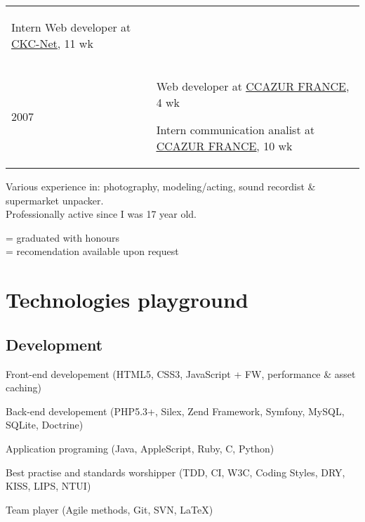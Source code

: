 \documentclass[letterpaper]{article}
\renewenvironment{itemize}{
    \begin{list}{}{
        \setlength{\leftmargin}{1.5em}
    }
}{
    \end{list}
}
\begin{document}
\begin{tabular}{p{1cm}p{\textwidth}}
\begin{itemize}
                \item Intern Web developer at \uline{\href{http://www.ckc-net.com}{CKC-Net}}, 11 wk
            \end{itemize} \\
            \large{2007} & \vspace{-6mm} \begin{itemize}
                \item Web developer at \uline{\href{http://www.ccazur.com}{CCAZUR FRANCE}}, 4 wk
                \item Intern communication analist at \uline{\href{http://www.ccazur.com}{CCAZUR FRANCE}}, 10 wk
            \end{itemize}
        \end{tabular}
        
        \vspace{0.6cm}
        Various experience in: photography, modeling/acting, sound recordist \& supermarket unpacker.\\
        Professionally active since I was 17 year old.

        \vfill
        \begin{flushright}
            \small{ = graduated with honours} \\
            \small{ = recomendation available upon request}
        \end{flushright}

    \section*{Technologies playground}
        
        \subsection*{Development}
            
            \begin{itemize}
                \item Front-end developement (HTML5, CSS3, JavaScript + FW, performance \& asset caching)
                \item Back-end developement (PHP5.3+, Silex, Zend Framework, Symfony, MySQL, SQLite, Doctrine)
                \item Application programing (Java, AppleScript, Ruby, C, Python)
                \item Best practise and standards worshipper (TDD, CI, W3C, Coding Styles, DRY, KISS, LIPS, NTUI)
                \item Team player (Agile methods, Git, SVN, \LaTeX)
            \end{itemize}
            
\end{document}
